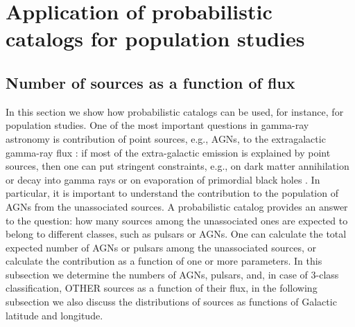 \section{Application of probabilistic catalogs for population studies}

\subsection{Number of sources as a function of flux}


In this section we show how probabilistic catalogs can be used, for instance, for population studies.
One of the most important questions in gamma-ray astronomy is contribution of point sources, 
e.g., AGNs, to the extragalactic gamma-ray flux 
\citep[e.g.,][]{2010ApJ...720..435A, 2011ApJ...738..181M, 2016PhRvL.116o1105A, 2016ApJS..225...18Z, 2016ApJ...826L..31Z, 2016ApJ...832..117L, 2018ApJ...856..106D}:
if most of the extra-galactic emission is explained by point sources, then one can put stringent constraints, 
e.g., on  dark matter annihilation or decay into gamma rays 
\citep{2015ApJ...800L..27A, 2015PhRvD..91l3001D, 2015JCAP...09..008F, 2015PhR...598....1F, 2017ChPhC..41d5104L} or 
on evaporation of primordial black holes \citep{2010PhRvD..81j4019C}.
In particular, it is important to understand the contribution to the population of AGNs from the unassociated sources.
A probabilistic catalog provides an answer to the question: how many sources among the unassociated ones are expected to belong to different classes, such as pulsars or AGNs. 
One can calculate the total expected number of AGNs or pulsars among the unassociated sources, or calculate the contribution as a function of one or more parameters.
In this subsection we determine the numbers of AGNs, pulsars, and, in case of 3-class classification, OTHER sources as a function of their flux, in the following subsection we also discuss the distributions of sources as functions
of Galactic latitude and longitude.




